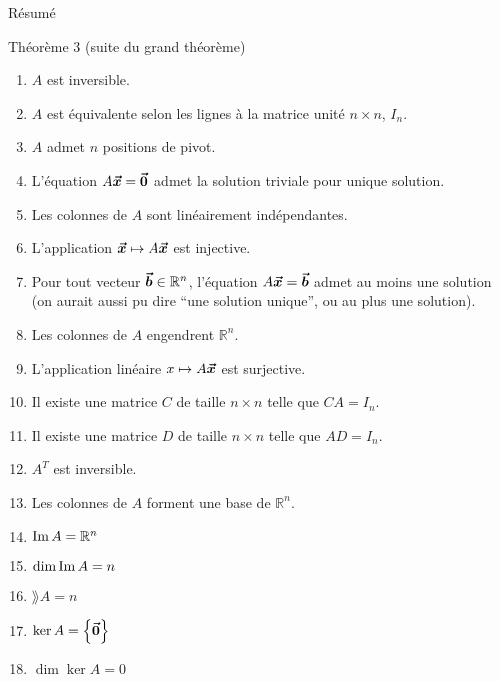 \documentclass[a4paper]{article}
\begin{document}
\begin{parag}{Résumé}
\begin{subparag}{Théorème 3 (suite du grand théorème)}
        \begin{enumerate}[left=0pt]
            \item $A$ est inversible.
            \item $A$ est équivalente selon les lignes à la matrice unité $n \times n$, $I_n$.
            \item $A$ admet $n$ positions de pivot.
            \item L'équation $A \bm{\protect\vec{x}} = \bm{\protect\vec{0}}$ admet la solution triviale pour unique solution.
            \item Les colonnes de $A$ sont linéairement indépendantes.
            \item L'application $\bm{\protect\vec{x}} \mapsto A \bm{\protect\vec{x}}$ est injective.
            \item Pour tout vecteur $\bm{\protect\vec{b}} \in \mathbb{R}^{n}$, l'équation $A \bm{\protect\vec{x}} = \bm{\protect\vec{b}}$ admet au moins une solution (on aurait aussi pu dire ``une solution unique'', ou au plus une solution).
            \item Les colonnes de $A$ engendrent $\mathbb{R}^{n}$.
            \item L'application linéaire $x \mapsto A \bm{\protect\vec{x}}$ est surjective.
            \item Il existe une matrice $C$ de taille $n \times n$ telle que $CA = I_n$.
            \item Il existe une matrice $D$ de taille $n \times n$ telle que $AD = I_n$.
            \item $A^T$ est inversible.
            \item Les colonnes de $A$ forment une base de $\mathbb{R}^{n}$.
            \item $\operatorname{Im} A = \mathbb{R}^{n}$
            \item $\dim\operatorname{Im} A = n$
            \item $\rang A = n$
            \item $\ker A = \left\{\bvec{0}\right\}$
            \item $\dim\ker A = 0$
        \end{enumerate}

    \end{subparag}
\end{parag}
\end{document}
